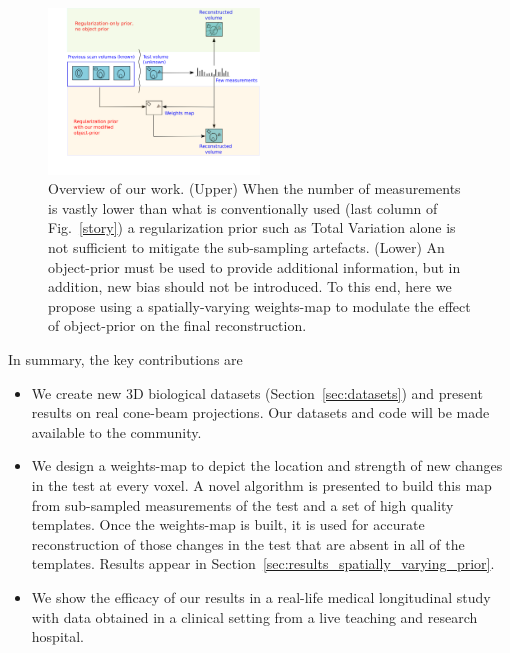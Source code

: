 \documentclass[journal]{IEEEtran}
\begin{document}
 \begin{figure}[h]
\centering
	\includegraphics[width=0.5\textwidth]{../images/prior_cmb.png}
        \caption{Overview of our work. (Upper) When the number of
          measurements is vastly lower than what is conventionally
          used (last column of Fig.~\ref{story}) a regularization
          prior such as Total Variation alone is not sufficient to
          mitigate the sub-sampling artefacts. (Lower) An object-prior
          must be used to provide additional information, but in
          addition, new bias should not be introduced. To this end,
          here we propose using a spatially-varying weights-map to
          modulate the effect of object-prior on the final
          reconstruction.}
 \label{fig:prior_overview}
\end{figure}

In summary, the key contributions are
\begin{itemize}
\item We create new 3D biological datasets (Section~\ref{sec:datasets}) and
  present results on real cone-beam projections. Our datasets and code
  will be made available to the community.
  \item We design a weights-map
    to depict the location and strength of new changes in the test at
    every voxel. A novel algorithm is presented to build this map from
    sub-sampled measurements of the test and a set of high quality
    templates. Once the weights-map is built, it is used for accurate
    reconstruction of those changes in the test that are absent in all
    of the templates. Results appear in
    Section~\ref{sec:results_spatially_varying_prior}.
  \item We show the efficacy of our results in a real-life medical
    longitudinal study with data obtained in a clinical setting from
    a live teaching and
    research hospital.
\end{itemize}

\end{document}
